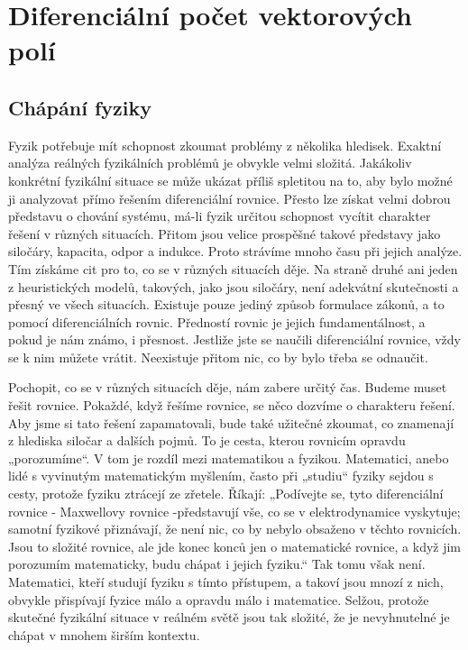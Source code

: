 \chapter{Diferenciální počet vektorových polí}\label{chap_fey_diff_vect_field}
\minitoc
\newpage
  \section{Chápání fyziky}
    \cite[s.~27]{Feynman02} Fyzik potřebuje mít schopnost zkoumat problémy z několika hledisek. 
    Exaktní analýza reálných fyzikálních problémů je obvykle velmi složitá. Jakákoliv konkrétní 
    fyzikální situace se může ukázat příliš spletitou na to, aby bylo možné ji analyzovat přímo 
    řešením diferenciální rovnice. Přesto lze získat velmi dobrou představu o chování systému, má-li 
    fyzik určitou schopnost vycítit charakter řešení v různých situacích. Přitom jsou velice 
    prospěšné takové představy jako siločáry, kapacita, odpor a indukce. Proto strávíme mnoho času 
    při jejich analýze. Tím získáme cit pro to, co se v různých situacích děje. Na straně druhé ani 
    jeden z heuristických modelů, takových, jako jsou siločáry, není adekvátní skutečnosti a přesný 
    ve všech situacích. Existuje pouze jediný způsob formulace zákonů, a to pomocí diferenciálních 
    rovnic. Předností rovnic je jejich fundamentálnost, a pokud je nám známo, i přesnost. Jestliže 
    jste se naučili diferenciální rovnice, vždy se k nim můžete vrátit. Neexistuje přitom nic, co by 
    bylo třeba se odnaučit.
    
    Pochopit, co se v různých situacích děje, nám zabere určitý čas. Budeme muset řešit rovnice. 
    Pokaždé, když řešíme rovnice, se něco dozvíme o charakteru řešení. Aby jsme si tato řešení 
    zapamatovali, bude také užitečné zkoumat, co znamenají z hlediska siločar a dalších pojmů. To je 
    cesta, kterou rovnicím opravdu „porozumíme“. V tom je rozdíl mezi matematikou a fyzikou. 
    Matematici, anebo lidé s vyvinutým matematickým myšlením, často při „studiu“ fyziky sejdou s 
    cesty, protože fyziku ztrácejí ze zřetele. Říkají: „Podívejte se, tyto diferenciální rovnice - 
    Maxwellovy rovnice -představují vše, co se v elektrodynamice vyskytuje; samotní fyzikové 
    přiznávají, že není nic, co by nebylo obsaženo v těchto rovnicích. Jsou to složité rovnice, ale 
    jde konec konců jen o matematické rovnice, a když jim porozumím matematicky, budu chápat i 
    jejich fyziku.“ Tak tomu však není. Matematici, kteří studují fyziku s tímto přístupem, a takoví 
    jsou mnozí z nich, obvykle přispívají fyzice málo a opravdu málo i matematice. Selžou, protože 
    skutečné fyzikální situace v reálném světě jsou tak složité, že je nevyhnutelné je chápat v 
    mnohem širším kontextu.
    

